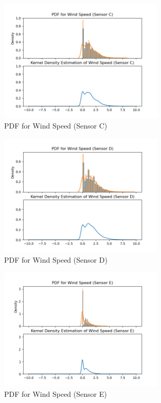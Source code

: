 \documentclass[a4paper,12pt]{article}
\begin{document}
  \begin{figure}[H] 
	\centering
	\includegraphics[width=0.7\textwidth]{PDF for Wind Speed (Sensor C).png}
	\caption{PDF for Wind Speed (Sensor C)\cite{Maiullari2020}}
  \end{figure}
  \begin{figure}[H] 
	\centering
	\includegraphics[width=0.7\textwidth]{PDF for Wind Speed (Sensor D).png}
	\caption{PDF for Wind Speed (Sensor D)\cite{Maiullari2020}}
  \end{figure}
  \begin{figure}[H] 
	\centering
	\includegraphics[width=0.7\textwidth]{PDF for Wind Speed (Sensor E).png}
	\caption{PDF for Wind Speed (Sensor E)\cite{Maiullari2020}}
  \end{figure}
\pagebreak
\end{document}
